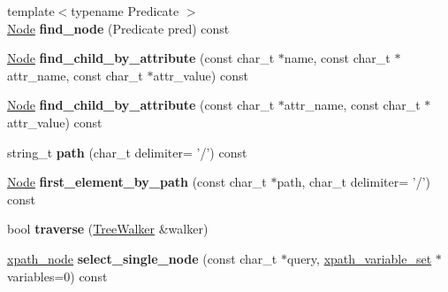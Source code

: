 \begin{DoxyCompactItemize}
\item 
\hypertarget{classphys_1_1xml_1_1Node_af755f4925f6839e0f8a768cfc3b265d4}{
{\footnotesize template$<$typename Predicate $>$ }\\\hyperlink{classphys_1_1xml_1_1Node}{Node} {\bfseries find\_\-node} (Predicate pred) const }
\label{d7/d0a/classphys_1_1xml_1_1Node_af755f4925f6839e0f8a768cfc3b265d4}

\item 
\hypertarget{classphys_1_1xml_1_1Node_ad877293c5bfd97ea7f4e6319db816ac4}{
\hyperlink{classphys_1_1xml_1_1Node}{Node} {\bfseries find\_\-child\_\-by\_\-attribute} (const char\_\-t $\ast$name, const char\_\-t $\ast$attr\_\-name, const char\_\-t $\ast$attr\_\-value) const }
\label{d7/d0a/classphys_1_1xml_1_1Node_ad877293c5bfd97ea7f4e6319db816ac4}

\item 
\hypertarget{classphys_1_1xml_1_1Node_aa3ea620c51e0af54aebcf78586086a9a}{
\hyperlink{classphys_1_1xml_1_1Node}{Node} {\bfseries find\_\-child\_\-by\_\-attribute} (const char\_\-t $\ast$attr\_\-name, const char\_\-t $\ast$attr\_\-value) const }
\label{d7/d0a/classphys_1_1xml_1_1Node_aa3ea620c51e0af54aebcf78586086a9a}

\item 
\hypertarget{classphys_1_1xml_1_1Node_a74b9f51a6642808510e71f643cc861ad}{
string\_\-t {\bfseries path} (char\_\-t delimiter= '/') const }
\label{d7/d0a/classphys_1_1xml_1_1Node_a74b9f51a6642808510e71f643cc861ad}

\item 
\hypertarget{classphys_1_1xml_1_1Node_ad771e6d5faca7c608a6a6cd1e29dd3d8}{
\hyperlink{classphys_1_1xml_1_1Node}{Node} {\bfseries first\_\-element\_\-by\_\-path} (const char\_\-t $\ast$path, char\_\-t delimiter= '/') const }
\label{d7/d0a/classphys_1_1xml_1_1Node_ad771e6d5faca7c608a6a6cd1e29dd3d8}

\item 
\hypertarget{classphys_1_1xml_1_1Node_abf6c5b96ced5404a204a4700f044f982}{
bool {\bfseries traverse} (\hyperlink{classphys_1_1xml_1_1TreeWalker}{TreeWalker} \&walker)}
\label{d7/d0a/classphys_1_1xml_1_1Node_abf6c5b96ced5404a204a4700f044f982}

\item 
\hypertarget{classphys_1_1xml_1_1Node_a00f21e69b9a067e15f1f92b9b3e4ab13}{
\hyperlink{classphys_1_1xml_1_1xpath__node}{xpath\_\-node} {\bfseries select\_\-single\_\-node} (const char\_\-t $\ast$query, \hyperlink{classphys_1_1xml_1_1xpath__variable__set}{xpath\_\-variable\_\-set} $\ast$variables=0) const }
\label{d7/d0a/classphys_1_1xml_1_1Node_a00f21e69b9a067e15f1f92b9b3e4ab13}


\end{DoxyCompactItemize}

